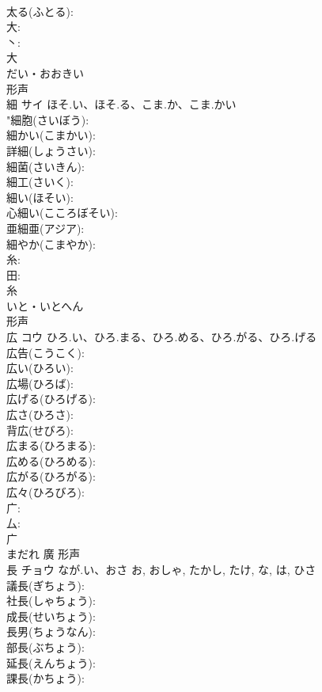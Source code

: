 \documentclass[8pt]{extreport}
\begin{document}
\begin{CJK}{UTF8}{min}
\\	太る(ふとる): 
\\	大: 
\\	丶: 
\\	大	
\\	だい・おおきい	
\\	形声 
\\	細	サイ	ほそ.い、ほそ.る、こま.か、こま.かい		
\\	"細胞(さいぼう): 
\\	細かい(こまかい): 
\\	詳細(しょうさい): 
\\	細菌(さいきん): 
\\	細工(さいく): 
\\	細い(ほそい): 
\\	心細い(こころぼそい): 
\\	亜細亜(アジア): 
\\	細やか(こまやか): 
\\	糸: 
\\	田: 
\\	糸	
\\	いと・いとへん	
\\	形声 
\\	広	コウ	ひろ.い、ひろ.まる、ひろ.める、ひろ.がる、ひろ.げる		
\\	広告(こうこく): 
\\	広い(ひろい): 
\\	広場(ひろば): 
\\	広げる(ひろげる): 
\\	広さ(ひろさ): 
\\	背広(せびろ): 
\\	広まる(ひろまる): 
\\	広める(ひろめる): 
\\	広がる(ひろがる): 
\\	広々(ひろびろ): 
\\	广: 
\\	厶: 
\\	广	
\\	まだれ	廣	形声 
\\	長	チョウ	なが.い、おさ	お, おしゃ, たかし, たけ, な, は, ひさ	
\\	議長(ぎちょう): 
\\	社長(しゃちょう): 
\\	成長(せいちょう): 
\\	長男(ちょうなん): 
\\	部長(ぶちょう): 
\\	延長(えんちょう): 
\\	課長(かちょう): 

\end{CJK}
\end{document}
